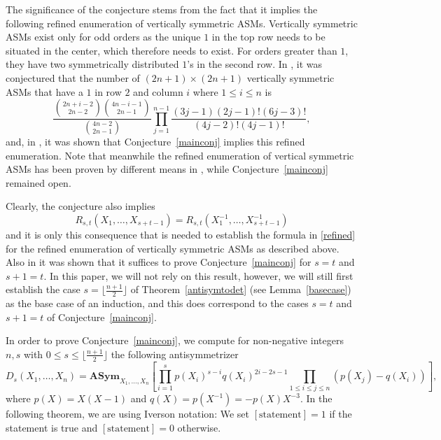 \documentclass[12pt,dvipsnames]{amsart}
\theoremstyle{definition}
\newcommand{\asym}{\mathbf{ASym}}
\begin{document}
The significance of the conjecture stems from the fact that it implies the following refined enumeration of vertically symmetric ASMs. Vertically 
symmetric ASMs exist only for odd orders as the unique $1$ in the top row needs to be situated in the center, which therefore needs to exist. For orders greater than $1$, they have two symmetrically distributed $1$'s in the second row. In \cite{half}, it was conjectured 
that the number of $(2n+1) \times (2n+1)$ vertically symmetric ASMs that have a $1$ in row $2$ and column $i$ where $1 \le i \le n$ is 
\begin{equation}
\label{refined}  
\frac{\binom{2n+i-2}{2n-2} \binom{4n-i-1}{2n-1}}{\binom{4n-2}{2n-1}} 
\prod_{j=1}^{n-1} \frac{(3j-1)(2j-1)!(6j-3)!}{(4j-2)!(4j-1)!}, 
\end{equation} 
and, in \cite{FisRie}, it was shown that Conjecture~\ref{mainconj} implies this refined enumeration. Note that meanwhile the refined enumeration of vertical symmetric ASMs has been proven by different means in \cite{FisSai}, while Conjecture~\ref{mainconj} remained open.


Clearly, the conjecture also implies 
$$
R_{s,t}(X_1,\ldots,X_{s+t-1}) = R_{s,t}(X_1^{-1},\ldots,X_{s+t-1}^{-1})
$$
and it is only this consequence that is needed to establish the formula in \eqref{refined} for the refined enumeration of vertically symmetric ASMs as described above. Also in \cite{FisRie} it was shown that it suffices to prove Conjecture~\ref{mainconj} for $s=t$ and $s+1=t$. In this paper, we will not rely on this result, however, we will still first establish the 
case $s= \lfloor \frac{n+1}{2} \rfloor$ of Theorem~\ref{antisymtodet} (see Lemma~\ref{basecase}) as the base case of an induction, and this does correspond to the cases $s=t$ and $s+1=t$ of Conjecture~\ref{mainconj}.

\medskip

In order to prove Conjecture~\ref{mainconj}, we compute for non-negative integers $n,s$ with $0 \le s \le \lfloor \frac{n+1}{2} \rfloor$ 
the following antisymmetrizer 
\begin{equation}
\label{D}
D_s(X_1,\ldots,X_n)=\asym_{X_1,\ldots,X_n} \left[ \prod_{i=1}^s p(X_i)^{s-i} q(X_i)^{2i-2s-1} 
\prod_{1 \le i \le j \le n} (p(X_j)-q(X_i)) \right], 
\end{equation}
where $p(X)=X(X-1)$ and $q(X)=p(X^{-1})=-p(X)X^{-3}$.
In the following theorem, we are using Iverson notation: We set $[\text{statement}]=1$ if the statement is true and 
$[\text{statement}]=0$ otherwise. 
\end{document}
